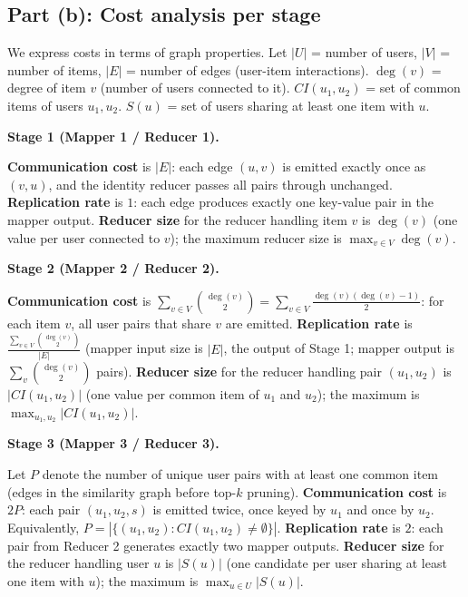 \documentclass[a4paper,11pt]{article}
\begin{document}
\subsection*{Part (b): Cost analysis per stage}

We express costs in terms of graph properties. Let $|U|$ = number of users, $|V|$ = number of items, $|E|$ = number of edges (user-item interactions). $\deg(v)$ = degree of item $v$ (number of users connected to it). $CI(u_1,u_2)$ = set of common items of users $u_1, u_2$. $S(u)$ = set of users sharing at least one item with $u$.

\medskip

\textbf{Stage 1 (Mapper 1 / Reducer 1).}

\textbf{Communication cost} is $|E|$: each edge $(u,v)$ is emitted exactly once as $(v,u)$, and the identity reducer passes all pairs through unchanged. \textbf{Replication rate} is $1$: each edge produces exactly one key-value pair in the mapper output. \textbf{Reducer size} for the reducer handling item $v$ is $\deg(v)$ (one value per user connected to $v$); the maximum reducer size is $\max_{v \in V} \deg(v)$.

\medskip

\textbf{Stage 2 (Mapper 2 / Reducer 2).}

\textbf{Communication cost} is $\displaystyle\sum_{v \in V} \binom{\deg(v)}{2} = \sum_{v \in V} \frac{\deg(v)(\deg(v)-1)}{2}$: for each item $v$, all user pairs that share $v$ are emitted. \textbf{Replication rate} is $\displaystyle\frac{\sum_{v \in V} \binom{\deg(v)}{2}}{|E|}$ (mapper input size is $|E|$, the output of Stage 1; mapper output is $\sum_v \binom{\deg(v)}{2}$ pairs). \textbf{Reducer size} for the reducer handling pair $(u_1, u_2)$ is $|CI(u_1, u_2)|$ (one value per common item of $u_1$ and $u_2$); the maximum is $\max_{u_1,u_2} |CI(u_1,u_2)|$.

\medskip

\textbf{Stage 3 (Mapper 3 / Reducer 3).}

Let $P$ denote the number of unique user pairs with at least one common item (edges in the similarity graph before top-$k$ pruning). \textbf{Communication cost} is $2P$: each pair $(u_1, u_2, s)$ is emitted twice, once keyed by $u_1$ and once by $u_2$. Equivalently, $P = |\{(u_1,u_2) : CI(u_1,u_2) \neq \emptyset\}|$. \textbf{Replication rate} is $2$: each pair from Reducer 2 generates exactly two mapper outputs. \textbf{Reducer size} for the reducer handling user $u$ is $|S(u)|$ (one candidate per user sharing at least one item with $u$); the maximum is $\max_{u \in U} |S(u)|$.
\end{document}
